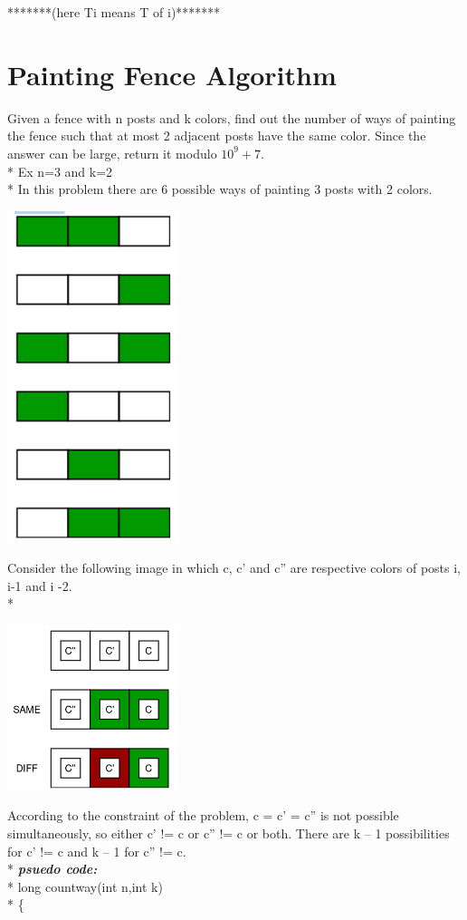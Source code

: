 \documentclass[12pt]{book}
\begin{document}
*******(here Ti means T of i)*******

\chapter{Painting Fence Algorithm}
Given a fence with n posts and k colors, find out the number of ways of painting the fence such that at most 2 adjacent posts have the same color. Since the answer can be large, return it modulo $10^9 + 7$.\\*
Ex n=3 and k=2\\*
\newline
In this problem there are 6 possible ways of painting 3 posts with 2 colors.
\begin{center}
    \includegraphics[width =5cm]{DhF7y5v.png}    
\end{center}
Consider the following image in which c, c’ and c” are respective colors of posts i, i-1 and i -2.\\*
\begin{center}
    \includegraphics[width =5cm]{KDIJhWx.png}    
\end{center}
According to the constraint of the problem, c = c’ = c” is not possible simultaneously, so either c’ != c or c” != c or both. There are k – 1 possibilities for c’ != c and k – 1 for c” != c.\\*
\newline
\textbf{\textit{psuedo code:}}\\*
long countway(int n,int k)\\*
\{
\end{document}
